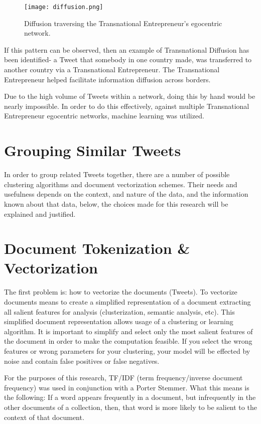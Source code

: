 \begin{figure}[H]
  \centering
  \texttt{[image: diffusion.png]}
  \caption{Diffusion traversing the Transnational Entrepreneur's egocentric network.}
\end{figure}

If this pattern can be observed, then an example of Transnational
Diffusion has been identified- a Tweet that somebody in one country
made, was transferred to another country via a Transnational
Entrepreneur. The Transnational Entrepreneur helped facilitate
information diffusion across borders.

Due to the high volume of Tweets within a network, doing this by hand
would be nearly impossible. In order to do this effectively, against
multiple Transnational Entrepreneur egocentric networks, machine
learning was utilized.

\section{Grouping Similar Tweets}
In order to group related Tweets together, there are a number of
possible clustering algorithms and document vectorization
schemes. Their needs and usefulness depends on the context, and nature
of the data, and the information known about that data, below, the
choices made for this research will be explained and justified.

\section{Document Tokenization \& Vectorization}
The first problem is: how to vectorize the documents (Tweets). To
vectorize documents means to create a simplified representation of a
document extracting all salient features for analysis (clusterization,
semantic analysis, etc). This simplified document representation
allows usage of a clustering or learning algorithm. It is important to
simplify and select only the most salient features of the document in
order to make the computation feasible. If you select the wrong
features or wrong parameters for your clustering, your model will be
effected by noise and contain false positives or false negatives.

For the purposes of this research, TF/IDF (term frequency/inverse
document frequency) was used in conjunction with a Porter
Stemmer. What this means is the following: If a word appears
frequently in a document, but infrequently in the other documents of a
collection, then, that word is more likely to be salient to the
context of that document.

